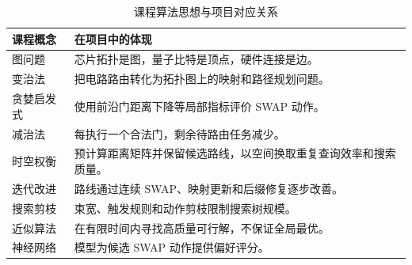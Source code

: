 \begin{table}[H]
  \centering
  \caption{课程算法思想与项目对应关系}
  \label{tab:course-mapping}
  \begin{tabularx}{\linewidth}{lY}
    \toprule
    课程概念 & 在项目中的体现 \\
    \midrule
    图问题 & 芯片拓扑是图，量子比特是顶点，硬件连接是边。 \\
    变治法 & 把电路路由转化为拓扑图上的映射和路径规划问题。 \\
    贪婪启发式 & 使用前沿门距离下降等局部指标评价 SWAP 动作。 \\
    减治法 & 每执行一个合法门，剩余待路由任务减少。 \\
    时空权衡 & 预计算距离矩阵并保留候选路线，以空间换取重复查询效率和搜索质量。 \\
    迭代改进 & 路线通过连续 SWAP、映射更新和后缀修复逐步改善。 \\
    搜索剪枝 & 束宽、触发规则和动作剪枝限制搜索树规模。 \\
    近似算法 & 在有限时间内寻找高质量可行解，不保证全局最优。 \\
    神经网络 & 模型为候选 SWAP 动作提供偏好评分。 \\
    \bottomrule
  \end{tabularx}
\end{table}
